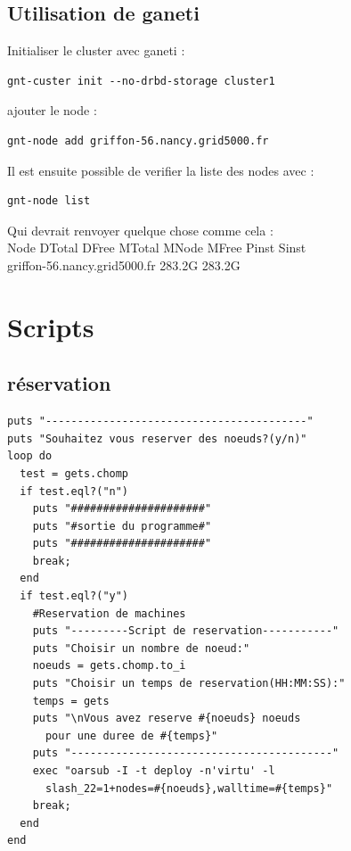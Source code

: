 \documentclass[a4paper,11pt]{report}
\begin{document}
\section{Utilisation de ganeti}
Initialiser le cluster avec ganeti :
\begin{lstlisting}
gnt-custer init --no-drbd-storage cluster1
\end{lstlisting}
ajouter le node :
\begin{lstlisting}
gnt-node add griffon-56.nancy.grid5000.fr
\end{lstlisting}

Il est ensuite possible de verifier la liste des nodes avec :
\begin{lstlisting}
gnt-node list
\end{lstlisting}
Qui devrait renvoyer quelque chose comme cela :\\
Node                         DTotal  DFree MTotal MNode MFree Pinst Sinst\\
griffon-56.nancy.grid5000.fr 283.2G 283.2G  
    
  \newpage
    \chapter{Scripts}
      \section{réservation}
      \begin{lstlisting}
puts "-----------------------------------------"
puts "Souhaitez vous reserver des noeuds?(y/n)"
loop do
  test = gets.chomp
  if test.eql?("n")
    puts "#####################"
    puts "#sortie du programme#"
    puts "#####################"
    break;
  end
  if test.eql?("y")
    #Reservation de machines                                                 
    puts "---------Script de reservation-----------"
    puts "Choisir un nombre de noeud:"
    noeuds = gets.chomp.to_i
    puts "Choisir un temps de reservation(HH:MM:SS):"
    temps = gets
    puts "\nVous avez reserve #{noeuds} noeuds 
	  pour une duree de #{temps}"
    puts "-----------------------------------------"
    exec "oarsub -I -t deploy -n'virtu' -l 
	  slash_22=1+nodes=#{noeuds},walltime=#{temps}"
    break;
  end
end
      \end{lstlisting}
      
      \newpage
\end{document}
